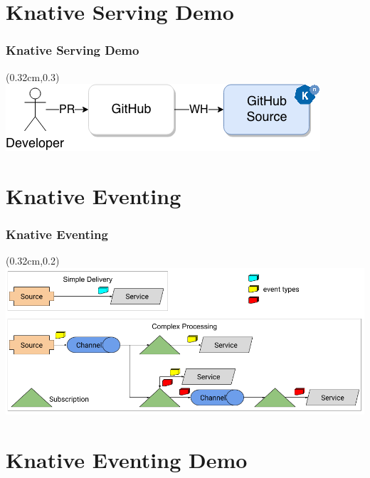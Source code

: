 \documentclass[aspectratio=169,11pt,hyperref={colorlinks=true}]{beamer}
\begin{document}
\begin{lblackrwhiteframe}
\begin{lblackrwhiteframe}
\section{Knative Serving Demo}

\begin{tblackbgrayframe}
  \frametitle{Knative Serving Demo}
  \begin{textblock*}{\paperwidth}(0.32cm,0.3\paperheight)
    \centering
    \includegraphics[width=0.7\paperwidth]{img/knative-serving-demo.png}
  \end{textblock*}
\end{tblackbgrayframe}

\section{Knative Eventing}

\begin{tblackbgrayframe}
  \frametitle{Knative Eventing}
  \begin{textblock*}{\paperwidth}(0.32cm,0.2\paperheight)
    \centering
    \includegraphics[width=0.9\paperwidth]{img/eventing-control-plane.png}
  \end{textblock*}
\end{tblackbgrayframe}

\section{Knative Eventing Demo}


\end{lblackrwhiteframe}
\end{lblackrwhiteframe}
\end{document}
